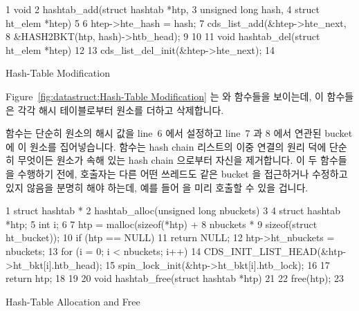 \begin{listing}[tb]
{ \scriptsize
\begin{verbbox}
 1 void
 2 hashtab_add(struct hashtab *htp,
 3             unsigned long hash,
 4             struct ht_elem *htep)
 5 {
 6   htep->hte_hash = hash;
 7   cds_list_add(&htep->hte_next,
 8                &HASH2BKT(htp, hash)->htb_head);
 9 }
10 
11 void hashtab_del(struct ht_elem *htep)
12 {
13   cds_list_del_init(&htep->hte_next);
14 }
\end{verbbox}
}
\centering
\theverbbox
\caption{Hash-Table Modification}
\label{lst:datastruct:Hash-Table Modification}
\end{listing}

Figure~\ref{fig:datastruct:Hash-Table Modification}
는  와  함수들을 보이는데, 이 함수들은 각각
해시 테이블로부터 원소를 더하고 삭제합니다.

 함수는 단순히 원소의 해시 값을 line~6 에서 설정하고 line~7
과 8 에서 연관된 bucket 에 이 원소를 집어넣습니다.
 함수는 hash chain 리스트의 이중 연결의 원리 덕에 단순히
무엇이든 원소가 속해 있는 hash chain 으로부터 자신을 제거합니다.
이 두 함수들을 수행하기 전에, 호출자는 다른 어떤 쓰레드도 같은 bucket 을
접근하거나 수정하고 있지 않음을 분명히 해야 하는데, 예를 들어
 을 미리 호출할 수 있을 겁니다.

\begin{listing}[tb]
{ \scriptsize
\begin{verbbox}
 1 struct hashtab *
 2 hashtab_alloc(unsigned long nbuckets)
 3 {
 4   struct hashtab *htp;
 5   int i;
 6 
 7   htp = malloc(sizeof(*htp) +
 8                nbuckets *
 9                sizeof(struct ht_bucket));
10   if (htp == NULL)
11     return NULL;
12   htp->ht_nbuckets = nbuckets;
13   for (i = 0; i < nbuckets; i++) {
14     CDS_INIT_LIST_HEAD(&htp->ht_bkt[i].htb_head);
15     spin_lock_init(&htp->ht_bkt[i].htb_lock);
16   }
17   return htp;
18 }
19 
20 void hashtab_free(struct hashtab *htp)
21 {
22   free(htp);
23 }
\end{verbbox}
}
\centering
\theverbbox
\caption{Hash-Table Allocation and Free}
\label{lst:datastruct:Hash-Table Allocation and Free}
\end{listing}

